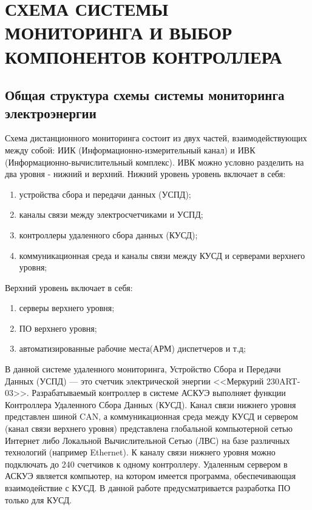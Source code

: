 \chapter{СХЕМА СИСТЕМЫ МОНИТОРИНГА И ВЫБОР КОМПОНЕНТОВ КОНТРОЛЛЕРА}

\section{Общая структура схемы системы мониторинга электроэнергии}

Схема дистанционного мониторинга состоит из двух частей, взаимодействующих между собой: ИИК (Информационно-измерительный канал) и ИВК (Информационно-вычислительный комплекс). ИВК можно условно разделить на два уровня - нижний и верхний. Нижний уровень уровень включает в себя:
\begin{enumerate}
	\item устройства сбора и передачи данных (УСПД);
	\item каналы связи между электросчетчиками и УСПД;
	\item контроллеры удаленного сбора данных (КУСД);
	\item коммуникационная среда и каналы связи между КУСД и серверами верхнего уровня;
\end{enumerate}

Верхний уровень включает в себя:
\begin{enumerate}
	\item серверы верхнего уровня;
	\item ПО верхнего уровня;
	\item автоматизированные рабочие места(АРМ) диспетчеров и т.д;
\end{enumerate}

В данной системе удаленного мониторинга, Устройство Сбора и Передачи Данных (УСПД) --- это счетчик электрической энергии <<Меркурий 230ART-03>>. Разрабатываемый контроллер в системе АСКУЭ выполняет функции Контроллера Удаленного Сбора Данных (КУСД). Канал связи нижнего уровня представлен шиной CAN, а коммуникационная среда между КУСД и сервером (канал связи верхнего уровня) представлена глобальной компьютерной сетью Интернет либо Локальной Вычислительной Сетью (ЛВС) на базе различных технологий (например Ethernet). К каналу связи нижнего уровня можно подключать до 240 счетчиков к одному контроллеру\cite{mercinfo1}. Удаленным сервером в АСКУЭ является компьютер, на котором имеется программа, обеспечивающая взаимодействие с КУСД. В данной работе предусматривается разработка ПО только для КУСД.

